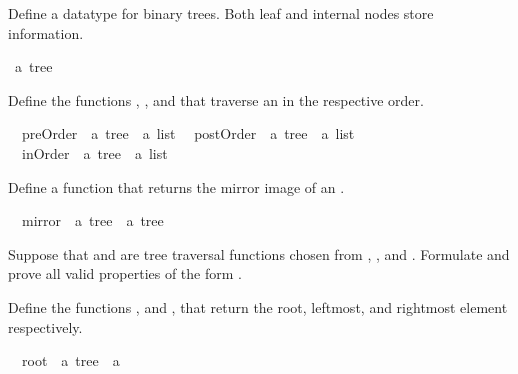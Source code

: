 %
\begin{isabellebody}%
\def\isabellecontext{a{\isadigit{2}}}%
\isamarkupfalse%
%
\isamarkuptrue%
%
\begin{isamarkuptext}%
Define a datatype  for binary trees. Both leaf
and internal nodes store information.%
\end{isamarkuptext}%
\isamarkuptrue%
\ {\isacharprime}a\ tree\isamarkupfalse%
%
\begin{isamarkuptext}%
Define the functions , , and  that traverse an  in the respective order.%
\end{isamarkuptext}%
\isamarkuptrue%
\ \ preOrder\ {\isacharcolon}{\isacharcolon}\ {\isachardoublequote}{\isacharprime}a\ tree\ {\isasymRightarrow}\ {\isacharprime}a\ list{\isachardoublequote}\isanewline
\ \ postOrder\ {\isacharcolon}{\isacharcolon}\ {\isachardoublequote}{\isacharprime}a\ tree\ {\isasymRightarrow}\ {\isacharprime}a\ list{\isachardoublequote}\isanewline
\ \ inOrder\ {\isacharcolon}{\isacharcolon}\ {\isachardoublequote}{\isacharprime}a\ tree\ {\isasymRightarrow}\ {\isacharprime}a\ list{\isachardoublequote}\isamarkupfalse%
%
\begin{isamarkuptext}%
Define a function  that returns the mirror image of an .%
\end{isamarkuptext}%
\isamarkuptrue%
\ \ mirror\ {\isacharcolon}{\isacharcolon}\ {\isachardoublequote}{\isacharprime}a\ tree\ {\isasymRightarrow}\ {\isacharprime}a\ tree{\isachardoublequote}\isamarkupfalse%
%
\begin{isamarkuptext}%
Suppose that  and  are tree traversal
functions chosen from , , and . Formulate and prove all valid properties of the form
\mbox{}.%
\end{isamarkuptext}%
\isamarkuptrue%
%
\begin{isamarkuptext}%
Define the functions ,  and , that return the root, leftmost, and rightmost element
respectively.%
\end{isamarkuptext}%
\isamarkuptrue%
\ \ root\ {\isacharcolon}{\isacharcolon}\ {\isachardoublequote}{\isacharprime}a\ tree\ {\isasymRightarrow}\ {\isacharprime}a{\isachardoublequote}\isanewline

\end{isabellebody}
